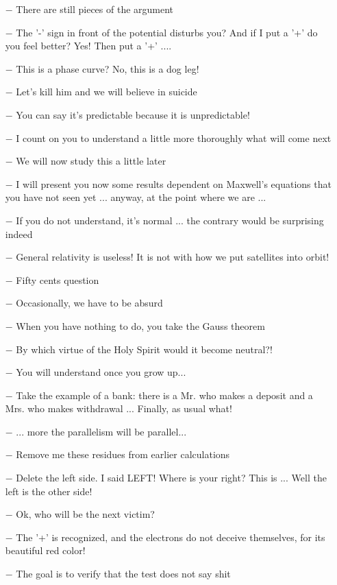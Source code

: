 \begin{itemize}	 
	\item[$-$] There are still pieces of the argument
	\item[$-$] The '-' sign in front of the potential disturbs you? And if I put a '+' do you feel better? Yes! Then put a '+' ....
	\item[$-$] This is a phase curve? No, this is a dog leg! 
	\item[$-$] Let's kill him and we will believe in suicide
	\item[$-$] You can say it's predictable because it is unpredictable!
	\item[$-$] I count on you to understand a little more thoroughly what will come next
	\item[$-$] We will now study this a little later
	\item[$-$] I will present you now some results dependent on Maxwell's equations that you have not seen yet ... anyway, at the point where we are ... 
	\item[$-$] If you do not understand, it's normal ... the contrary would be surprising indeed 
	\item[$-$] General relativity is useless! It is not with how we put satellites into orbit! 
	\item[$-$] Fifty cents question
	\item[$-$] Occasionally, we have to be absurd
	\item[$-$] When you have nothing to do, you take the Gauss theorem
	\item[$-$] By which virtue of the Holy Spirit would it become neutral?! 
	\item[$-$] You will understand once you grow up...
	\item[$-$] Take the example of a bank: there is a Mr. who makes a deposit and a Mrs. who makes withdrawal ... Finally, as usual what! 
	\item[$-$] ... more the parallelism will be parallel...
	\item[$-$] Remove me these residues from earlier calculations 
	\item[$-$] Delete the left side. I said LEFT! Where is your right? This is ... Well the left is the other side! 
	\item[$-$] Ok, who will be the next victim?
	\item[$-$] The '+' is recognized, and the electrons do not deceive themselves, for its beautiful red color! 
	\item[$-$] The goal is to verify that the test does not say shit 

\end{itemize}
